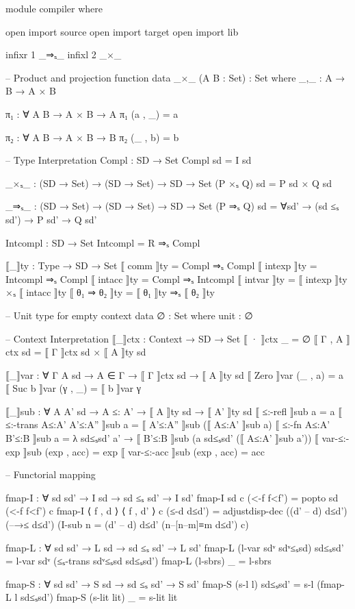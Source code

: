 \documentclass{article}
\begin{document}
\begin{prev}
\begin{code}
module compiler where

open import source
open import target
open import lib


infixr 1 _⇒ₛ_ 
infixl 2 _×_

-- Product and projection function
data _×_ (A B : Set) : Set where
    _,_ : A → B → A × B

π₁ : ∀ {A B} → A × B → A
π₁ (a , _) = a

π₂ : ∀ {A B} → A × B → B
π₂ (_ , b) = b

--  Type Interpretation
Compl : SD → Set
Compl sd = I sd

_×ₛ_ : (SD → Set) → (SD → Set) → SD → Set
(P ×ₛ Q) sd = P sd × Q sd

_⇒ₛ_ : (SD → Set) → (SD → Set) → SD → Set
(P ⇒ₛ Q) sd = ∀{sd'} → (sd ≤ₛ sd') → P sd' → Q sd' 

Intcompl : SD → Set
Intcompl = R ⇒ₛ Compl


⟦_⟧ty : Type → SD → Set
⟦ comm ⟧ty = Compl ⇒ₛ Compl
⟦ intexp ⟧ty = Intcompl ⇒ₛ Compl
⟦ intacc ⟧ty = Compl ⇒ₛ Intcompl
⟦ intvar ⟧ty = ⟦ intexp ⟧ty ×ₛ ⟦ intacc ⟧ty
⟦ θ₁ ⇒ θ₂ ⟧ty = ⟦ θ₁ ⟧ty ⇒ₛ ⟦ θ₂ ⟧ty

-- Unit type for empty context
data ∅ : Set where
    unit : ∅

-- Context Interpretation
⟦_⟧ctx : Context → SD → Set
⟦ · ⟧ctx _ = ∅
⟦ Γ , A ⟧ctx sd = ⟦ Γ ⟧ctx sd × ⟦ A ⟧ty sd

⟦_⟧var : ∀ {Γ A sd} → A ∈ Γ → ⟦ Γ ⟧ctx sd → ⟦ A ⟧ty sd
⟦ Zero ⟧var (_ , a) = a
⟦ Suc b ⟧var (γ , _) =  ⟦ b ⟧var γ

⟦_⟧sub : ∀ {A A' sd} → A ≤: A' → ⟦ A ⟧ty sd → ⟦ A' ⟧ty sd
⟦ ≤:-refl ⟧sub a = a
⟦ ≤:-trans A≤:A' A'≤:A'' ⟧sub a = ⟦ A'≤:A'' ⟧sub (⟦ A≤:A' ⟧sub a)
⟦ ≤:-fn A≤:A' B'≤:B ⟧sub a = 
    λ sd≤ₛsd' a' → ⟦ B'≤:B ⟧sub (a sd≤ₛsd' (⟦ A≤:A' ⟧sub a'))
⟦ var-≤:-exp ⟧sub (exp , acc) = exp
⟦ var-≤:-acc ⟧sub (exp , acc) = acc


-- Functorial mapping

fmap-I : ∀ {sd sd'} → I sd → sd ≤ₛ sd' → I sd'
fmap-I {sd} c (<-f f<f') = popto sd (<-f f<f') c
fmap-I {⟨ f , d ⟩} {⟨ f , d' ⟩} c (≤-d d≤d') = 
    adjustdisp-dec ((d' – d) d≤d') (–→≤ d≤d') 
        (I-sub {n = (d' – d) d≤d'} (n–[n–m]≡m d≤d') c)

fmap-L : ∀ {sd sd'} → L sd → sd ≤ₛ sd' → L sd'
fmap-L (l-var sdᵛ sdᵛ≤ₛsd) sd≤ₛsd' = l-var sdᵛ (≤ₛ-trans sdᵛ≤ₛsd sd≤ₛsd')
fmap-L (l-sbrs) _ = l-sbrs 

fmap-S : ∀ {sd sd'} → S sd → sd ≤ₛ sd' → S sd'
fmap-S (s-l l) sd≤ₛsd' = s-l (fmap-L l sd≤ₛsd')
fmap-S (s-lit lit) _ = s-lit lit



\end{code}
\end{prev}
\end{document}
